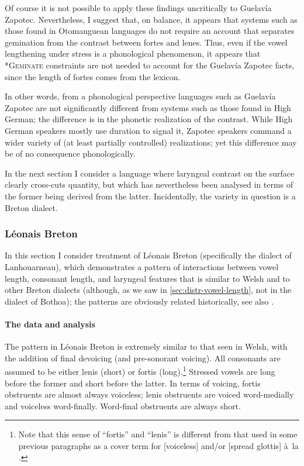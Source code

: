 Of course it is not possible to apply these findings uncritically to Guelavía Zapotec. Nevertheless, I suggest that, on balance, it appears that systems such as those found in Otomanguean languages do not require an account that separates gemination from the contrast between fortes and lenes. Thus, even if the vowel lengthening under stress is a phonological phenomenon, it appears that *\textsc{Geminate} constraints are not needed to account for the Guelavía Zapotec facts, since the length of fortes comes from the lexicon.

In other words, from a phonological perspective languages such as Guelavía Zapotec are not significantly different from systems such as those found in High German; the difference is in the phonetic realization of the contrast. While High German speakers mostly use duration to signal it, Zapotec speakers command a wider variety of (at least partially controlled) realizations; yet this difference may be of no consequence phonologically.

In the next section I consider a language where laryngeal contrast on the surface clearly cross\hyp cuts quantity, but which has nevertheless been analysed in terms of the former being derived from the latter. Incidentally, the variety in question is a Breton dialect.


\subsubsection{Léonais Breton}
\label{sec:leonais-breton}

In this section I consider  treatment of Léonais Breton (specifically the dialect of Lanhouarneau), which demonstrates a pattern of interactions between vowel length, consonant length, and laryngeal features that is similar to Welsh and to other Breton dialects (although, as we saw in \cref{sec:distr-vowel-length}, not in the dialect of Bothoa); the patterns are obviously related historically, see also \citet{falchun,lheb,histbreton,ternes11:_neubr}.

\paragraph{The data and  analysis}
\label{sec:data-possc-analys}

The pattern in Léonais Breton is extremely similar to that seen in Welsh, with the addition of final devoicing (and pre\hyp sonorant voicing). All consonants are assumed to be either lenis (short) or fortis (long).\footnote{Note that this sense of \enquote{fortis} and \enquote{lenis} is different from that used in some previous paragraphs as a cover term for [voiceless] and/or [spread glottis] à~la \citet{kohler84:_phonet}.} Stressed vowels are long before the former and short before the latter. In terms of voicing, fortis obstruents are almost always voiceless; lenis obstruents are voiced word-medially and voiceless word-finally. Word-final obstruents are always short.

